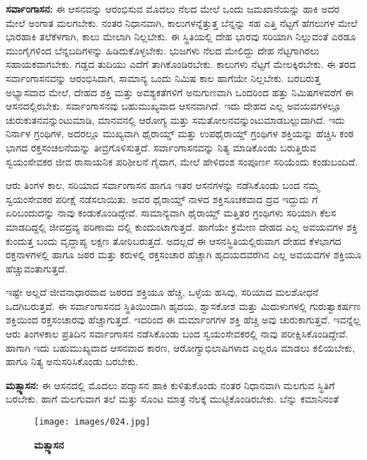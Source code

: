 \textbf{  ಸರ್ವಾಂಗಾಸನ:} ಈ ಆಸನವನ್ನು ಆರಂಭಿಸುವ ಮೊದಲು ನೆಲದ ಮೇಲೆ ಒಂದು ಜಮಖಾನೆಯನ್ನು ಹಾಕಿ ಅದರ ಮೇಲೆ ಅಂಗಾತ ಮಲಗಬೇಕು. ನಂತರ ನಿಧಾನವಾಗಿ, ಕಾಲುಗಳನ್ನೆತ್ತುತ್ತ ಬೆನ್ನನ್ನು ಸಹ ಎತ್ತಿ ನೆಟ್ಟಗೆ ಹೆಗಲುಗಳ ಮೇಲೆ ಭಾರಹಾಕಿ ತಲೆಕೆಳಗಾಗಿ, ಕಾಲು ಮೇಲಾಗಿ ನಿಲ್ಲಬೇಕು. ಈ ಸ್ಥಿತಿಯಲ್ಲಿ ದೇಹ ಭಾರವು ಸರಿಯಾಗಿ ನಿಲ್ಲುವಂತೆ ಎರಡೂ ಮುಂಗೈಗಳಿಂದ ಬೆನ್ನಬದಿಗಳನ್ನು ಹಿಡಿದುಕೊಳ್ಳಬೇಕು. ಭುಜಗಳು ನೆಲದ ಮೇಲಿದ್ದು ದೇಹ ನೆಟ್ಟಗಾಗಿರಲು ಸಹಾಯಕವಾಗಬೇಕು. ಗಡ್ಡದ ತುದಿಯು ಎದೆಗೆ ತಾಗಿಕೊಂಡಿರಬೇಕು. ಕಾಲುಗಳು ನೆಟ್ಟಗೆ ಮೇಲಕ್ಕಿರಬೇಕು. ಈ ತರದ ಸರ್ವಾಂಗಾಸನವನ್ನು ಆರಂಭಿಸಿದಾಗ, ಸಾಮಾನ್ಯ ಒಂದು ನಿಮಿಷ ಕಾಲ ಹಾಗೆಯೇ ನಿಲ್ಲಬೇಕು. ಬರಬರುತ್ತ ಅಭ್ಯಾಸವಾದ ಮೇಲೆ, ದೇಹದ ಶಕ್ತಿ ಮತ್ತು ಅವಶ್ಯಕತೆಗಳಿಗೆ ಅನುಗುಣವಾಗಿ ಒಂದರಿಂದ ಹತ್ತು ನಿಮಿಷಗಳವರೆಗೆ ಈ ಆಸನದಲ್ಲಿರಬೇಕು. ಸರ್ವಾಂಗಾಸನವು ಬಹುಮುಖ್ಯವಾದ ಆಸನವಾಗಿದೆ. ಇದು ದೇಹದ ಎಲ್ಲ ಅವಯವಗಳಲ್ಲೂ ಚುರುಕುತನವನ್ನುಂಟುಮಾಡಿ, ಮಾನವನಲ್ಲಿ ಆರೋಗ್ಯ ಮತ್ತು ಸಮತೋಲನವನ್ನುಂಟುಮಾಡಬಲ್ಲುದಾಗಿದೆ. ಇದು ನಿರ್ನಾಳ ಗ್ರಂಥಿಗಳ, ಅದರಲ್ಲೂ ಮುಖ್ಯವಾಗಿ ಥೈರಾಯ್ಡ್ ಮತ್ತು ಉಪಥೈರಾಯ್ಡ್ ಗ್ರಂಥಿಗಳ ಶಕ್ತಿಯನ್ನು ಹೆಚ್ಚಿಸಿ ಕಂಠ ಭಾಗದ ರಕ್ತಸಂಚಲನೆಯನ್ನು ತೀವ್ರಗೊಳಿಸುತ್ತದೆ. ಸರ್ವಾಂಗಾಸನವನ್ನು ನಿತ್ಯ ಮಾಡಿಕೊಂಡು ಬರುತ್ತಿರುವ ಸ್ವಯಂಸೇವಕರ ಜೀವ ರಾಸಾಯನಿಕ ಪರಿಶೀಲನೆ ಗೈದಾಗ, ಮೇಲೆ ಹೇಳಿದಂಶ ಸಂಪೂರ್ಣ ಸರಿಯೆಂದು ಕಂಡುಬಂದಿದೆ.

ಆರು ತಿಂಗಳ ಕಾಲ, ಸರಿಯಾದ ಸರ್ವಾಂಗಾಸನ ಹಾಗೂ ಇತರ ಆಸನಗಳನ್ನು ನಡೆಸಿಕೊಂಡು ಬಂದ ನಮ್ಮ ಸ್ವಯಂಸೇವಕರ ಪರೀಕ್ಷೆ ನಡೆಸಲಾಯಿತು. ಅವರ ಥೈರಾಯ್ಡ್ ನಾಳದ ಶಕ್ತಿಸೂಚಕವಾದ  ದ್ರವ  ಇದ್ದುದು  ಗೆ ಏರಿಬಂದುದನ್ನು ನಾವು ಕಂಡುಕೊಂಡಿದ್ದೇವೆ. ಸಾಮಾನ್ಯವಾಗಿ ಥೈರಾಯ್ಡ್ ಮತ್ತಿತರ ಗ್ರಂಥಿಗಳು ಸರಿಯಾಗಿ ಕೆಲಸ ಮಾಡದಿದ್ದಲ್ಲಿ ಜೀವದ್ರವ್ಯ ಪರಿಣಾಮ ದಲ್ಲಿ ಕುಂದುಂಟಾಗುತ್ತದೆ. ಹಾಗೆಯೇ ಕ್ರಮೇಣ ದೇಹದ ಎಲ್ಲ ಅವಯವಗಳ ಶಕ್ತಿ ಕುಂದುತ್ತ ಬಂದು ವೃದ್ದಾಪ್ಯ ಲಕ್ಷಣ ತೋರಿಬರುತ್ತದೆ. ಅದಲ್ಲದೆ ಈ ಆಸನಸ್ಥಿತಿಯಲ್ಲಿರುವಾಗ ದೇಹದ ಕೆಳಭಾಗದ ರಕ್ತನಾಳಗಳಲ್ಲಿ ಹಾಗೂ ಜಠರ ಮತ್ತು ಕರುಳಲ್ಲಿ ರಕ್ತಸಂಚಾರ ಹೆಚ್ಚಾಗಿ ಹೃದಯದವರೆಗಿನ ಎಲ್ಲ ಅವಯವಗಳ ಶಕ್ತಿಯೂ ಹೆಚ್ಚುವಂತಾಗುತ್ತದೆ.

ಇಷ್ಟೇ ಅಲ್ಲದೆ ಜೀವನಾಧಾರವಾದ ಜಠರದ ಶಕ್ತಿಯೂ ಹೆಚ್ಚಿ, ಒಳ್ಳೆಯ ಹಸಿವು, ಸರಿಯಾದ ಮಲಶೋಧನೆ ಒದಗಿಬರುತ್ತವೆ. ಈ ಸರ್ವಾಂಗಾಸನದ ಸ್ಥಿತಿಯಿಂದಾಗಿ ಹೃದಯ, ಶ್ವಾಸಕೋಶ ಮತ್ತು ಮಿದುಳುಗಳಲ್ಲಿ ಗುರುತ್ವಾಕರ್ಷಣ ಶಕ್ತಿಯಿಂದ ರಕ್ತಸಂಚಾರವು ಹೆಚ್ಚಾಗುತ್ತದೆ. ಇದರಿಂದ ಈ ಮರ್ಮಾಂಗಗಳ ಶಕ್ತಿ ಹೆಚ್ಚಿ ಅವು ಚುರುಕಾಗುತ್ತವೆ. ಇವನ್ನೆಲ್ಲ ಆರು ತಿಂಗಳಕಾಲ ಪ್ರತಿದಿನ ಸರ್ವಾಂಗಾಸನ ನಡೆಸಿಕೊಂಡು ಬಂದ ಸ್ವಯಂಸೇವಕರಲ್ಲಿ ನಾವು ಪರೀಕ್ಷಿಸಿಕೊಂಡಿದ್ದೇವೆ. ಹಾಗಾಗಿ ಇದು ಬಹುಮುಖ್ಯವಾದ ಆಸನವಾದ ಕಾರಣ, ಆರೋಗ್ಯಾಭಿಲಾಷಿಗಳಾದ ಎಲ್ಲರೂ ಮಾಡಲು ಕಲಿಯಬೇಕು, ಹಾಗೂ ನಿತ್ಯ ಅನುಸರಿಸಿಕೊಂಡು ಬರಬೇಕು.

\textbf{  ಮತ್ಸ್ಯಾಸನ:} ಈ ಆಸನದಲ್ಲಿ ಮೊದಲು ಪದ್ಮಾಸನ ಹಾಕಿ ಕುಳಿತುಕೊಂಡು ನಂತರ ನಿಧಾನವಾಗಿ ಮಲಗುವ ಸ್ಥಿತಿಗೆ ಬರಬೇಕು. ಹಾಗೆ ಮಲಗುವಾಗ ತಲೆ ಮತ್ತು ಸೊಂಟ ಮಾತ್ರ ನೆಲಕ್ಕೆ ಮುಟ್ಟಿಕೊಂಡಿರಬೇಕು. ಬೆನ್ನು ಕಮಾನಿನಂತೆ

\begin{figure}
\texttt{[image: images/024.jpg]}
\caption{ \textbf{ಮತ್ಸ್ಯಾಸನ} }
\end{figure}


